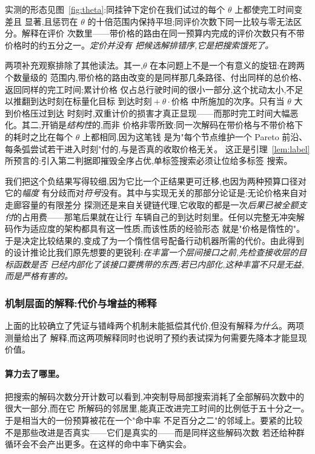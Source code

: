 \documentclass[manuscript,screen,review]{acmart}
\begin{document}
实测的形态见图~\ref{fig:theta}:同挂钟下定价在我们试过的每个 $\theta$ 上都使完工时间变差且
显著,且惩罚在 $\theta$ 的十倍范围内保持平坦;同评价次数下同一比较与零无法区分。解释在评价
次数里——带价格的路由在同一预算内完成的评价次数只有不带价格时的约五分之一。\emph{定价并没有
把候选解排错序,它是把搜索饿死了。}

两项补充观察排除了其他读法。其一,$\theta$ 在本问题上不是一个有意义的旋钮:在跨两个数量级的
范围内,带价格的路由改变的是同样那几条路径、付出同样的总价格、返回同样的完工时间;累计价格
仅占总行驶时间的很小一部分,这个扰动太小,不足以推翻到达时刻在标量化目标
$\text{到达时刻}+\theta\cdot\text{价格}$ 中所施加的次序。只有当 $\theta$ 大到价格压过到达
时刻时,双重计价的损害才真正显现——而那时完工时间大幅恶化。其二,开销是\emph{结构性}的,而非
价格非零所致:同一次解码在带价格与不带价格下的耗时之比在每个 $\theta$ 上都相同,因为这笔钱
是为"每个节点维护一个 Pareto 前沿、每条弧尝试若干进入时刻"付的,与是否真的收取价格无关。
这正是引理~\ref{lem:label} 所预言的:引入第二判据即摧毁全序占优,单标签搜索必须让位给多标签
搜索。

我们把这个负结果写得较细,因为它比一个正结果更可迁移,也因为两种预算口径对它的\emph{幅度}
有分歧而对\emph{符号}没有。其中与实现无关的那部分论证是:无论价格来自对走廊容量的有限差分
探测还是来自关键链代理,它收取的都是一次\emph{后果已被全额支付}的占用费——那笔后果就在让行
车辆自己的到达时刻里。任何以完整无冲突解码作为适应度的架构都具有这一性质,而该性质的经验形态
就是"价格是惰性的"。于是决定比较结果的,变成了为一个惰性信号配备行动机器所需的代价。由此得到
的设计推论比我们原先想要的更锐利:\emph{在丰富一个层间接口之前,先检查接收层的目标函数是否
已经内部化了该接口要携带的东西;若已内部化,这种丰富不只是无益,而是严格有害的。}

\subsubsection{机制层面的解释:代价与增益的稀释}
\label{sec:whycost}

上面的比较确立了凭证与错峰两个机制未能抵偿其代价,但没有解释\emph{为什么}。两项测量给出了
解释,而这两项解释同时也说明了预约表试探为何需要先降本才能显现价值。

\paragraph{算力去了哪里。}
把搜索的解码次数分开计数可以看到,冲突制导局部搜索消耗了全部解码次数中的很大一部分,而在它
所解码的邻居里,能真正改进完工时间的比例低于五十分之一。于是相当大的一份预算被花在一个"命中率
不足百分之二"的邻域上。要紧的比较不是那些改进是否真实——它们是真实的——而是同样这些解码次数
若还给种群循环会不会产出更多。在这样的命中率下确实会。
\end{document}
